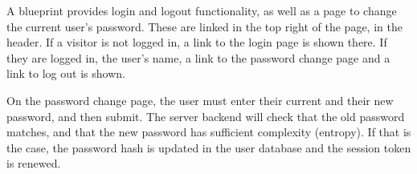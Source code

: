 A blueprint provides login and logout functionality, as well as a page to change the current user's password.
These are linked in the top right of the page, in the header.
If a visitor is not logged in, a link to the login page is shown there.
If they are logged in, the user's name, a link to the password change page and a link to log out is shown.

On the password change page, the user must enter their current and their new password, and then submit.
The server backend will check that the old password matches, and that the new password has sufficient complexity (entropy).
If that is the case, the password hash is updated in the user database and the session token is renewed.
